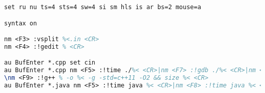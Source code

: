 \begin{lstlisting}[language=tex,identifierstyle=\color{black},commentstyle=\color{black}]
set ru nu ts=4 sts=4 sw=4 si sm hls is ar bs=2 mouse=a

syntax on

nm <F3> :vsplit %<.in <CR>
nm <F4> :!gedit % <CR>

au BufEnter *.cpp set cin
au BufEnter *.cpp nm <F5> :!time ./%< <CR>|nm <F7> :!gdb ./%< <CR>|nm <F8> :!time ./%< < %<.in <CR>|
\nm <F9> :!g++ % -o %< -g -std=c++11 -O2 && size %< <CR>
au BufEnter *.java nm <F5> :!time java %< <CR>|nm <F8> :!time java %< < %<.in <CR>|nm <F9> :!javac % <CR>
\end{lstlisting}

